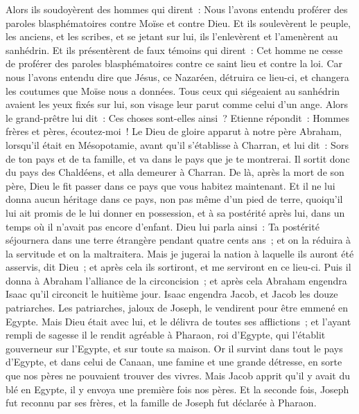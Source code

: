 \begin{multicols}{2}
Alors ils soudoyèrent des hommes qui dirent~: Nous l'avons entendu proférer des paroles blasphématoires contre Moïse et contre Dieu.
Et ils soulevèrent le peuple, les anciens, et les scribes, et se jetant sur lui, ils l'enlevèrent et l'amenèrent au sanhédrin.
Et ils présentèrent de faux témoins qui dirent~: Cet homme ne cesse de proférer des paroles blasphématoires contre ce saint lieu et contre la loi.
Car nous l'avons entendu dire que Jésus, ce Nazaréen, détruira ce lieu-ci, et changera les coutumes que Moïse nous a données.
Tous ceux qui siégeaient au sanhédrin avaient les yeux fixés sur lui, son visage leur parut comme celui d'un ange.
\VerseOne{}Alors le grand-prêtre lui dit~: Ces choses sont-elles ainsi~?
Etienne répondit~: Hommes frères et pères, écoutez-moi~! Le Dieu de gloire apparut à notre père Abraham, lorsqu'il était en Mésopotamie, avant qu'il s'établisse à Charran, et lui dit~:
Sors de ton pays et de ta famille, et va dans le pays que je te montrerai.
Il sortit donc du pays des Chaldéens, et alla demeurer à Charran. De là, après la mort de son père, Dieu le fit passer dans ce pays que vous habitez maintenant.
Et il ne lui donna aucun héritage dans ce pays, non pas même d'un pied de terre, quoiqu'il lui ait promis de le lui donner en possession, et à sa postérité après lui, dans un temps où il n'avait pas encore d'enfant.
Dieu lui parla ainsi~: Ta postérité séjournera dans une terre étrangère pendant quatre cents ans~; et on la réduira à la servitude et on la maltraitera.
Mais je jugerai la nation à laquelle ils auront été asservis, dit Dieu~; et après cela ils sortiront, et me serviront en ce lieu-ci.
Puis il donna à Abraham l'alliance de la circoncision~; et après cela Abraham engendra Isaac qu'il circoncit le huitième jour. Isaac engendra Jacob, et Jacob les douze patriarches.
Les patriarches, jaloux de Joseph, le vendirent pour être emmené en Egypte.
Mais Dieu était avec lui, et le délivra de toutes ses afflictions~; et l'ayant rempli de sagesse il le rendit agréable à Pharaon, roi d'Egypte, qui l'établit gouverneur sur l'Egypte, et sur toute sa maison.
Or il survint dans tout le pays d'Egypte, et dans celui de Canaan, une famine et une grande détresse, en sorte que nos pères ne pouvaient trouver des vivres.
Mais Jacob apprit qu'il y avait du blé en Egypte, il y envoya une première fois nos pères.
Et la seconde fois, Joseph fut reconnu par ses frères, et la famille de Joseph fut déclarée à Pharaon.

\end{multicols}

